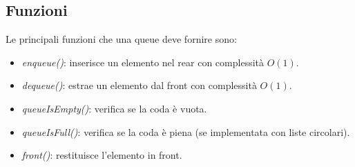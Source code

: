 \subsection{Funzioni}
Le principali funzioni che una queue deve fornire sono:
\begin{itemize}[noitemsep]
	\item \textit{enqueue()}: inserisce un elemento nel rear con complessità $O(1)$.
	\item \textit{dequeue()}: estrae un elemento dal front con complessità $O(1)$.
	\item \textit{queueIsEmpty()}: verifica se la coda è vuota.
	\item \textit{queueIsFull()}: verifica se la coda è piena (se implementata con liste circolari).
	\item \textit{front()}: restituisce l'elemento in front.
\end{itemize}